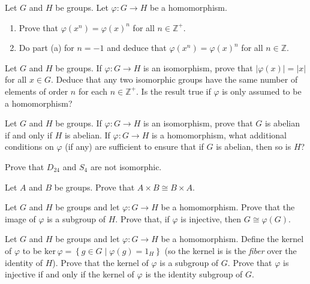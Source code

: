 \documentclass[
    11pt,a4paper,
]{exam}
\begin{document}
\begin{questions}
    
    
    \question
    
    Let \(G\) and \(H\) be groups.  Let \(\varphi: {G} \rightarrow {H}\) be a homomorphism.
    \begin{enumerate}[label=(\alph*)]
        \item Prove that \(\varphi\left(x^n\right)=\varphi(x)^n\) for all \(n \in \mathbb{Z}^{+}\).
        \item  Do part (a) for \(n=-1\) and deduce that \(\varphi\left(x^n\right)=\varphi(x)^n\) for all \(n \in \mathbb{Z}\).
    \end{enumerate}
    
    
    
    
    
    \question
    
    Let \(G\) and \(H\) be groups. If \(\varphi: G \rightarrow H\) is an isomorphism, prove that \(|\varphi(x)|=|x|\) for all \(x \in G\). Deduce that any two isomorphic groups have the same number of elements of order \(n\) for each \(n \in \mathbb{Z}^{+}\). Is the result true if \(\varphi\) is only assumed to be a homomorphism?
    
    \question
    Let \(G\) and \(H\) be groups. If \(\varphi: G \rightarrow H\) is an isomorphism, prove that \(G\) is abelian if and only if \(H\) is abelian. If \(\varphi: G \rightarrow H\) is a homomorphism, what additional conditions on \(\varphi\) (if any) are sufficient to ensure that if \(G\) is abelian, then so is \(H\)?
    
    \question
    Prove that \(D_{24}\) and \(S_4\) are not isomorphic.
    
    
    
    \question
    Let \(A\) and \(B\) be groups. Prove that \(A \times B \cong B \times A\).
    
    
    \question
    Let \(G\) and \(H\) be groups and let \(\varphi: G \rightarrow H\) be a homomorphism. 
    Prove that the image of \(\varphi\)  is a subgroup of \(H\).
    Prove that, if \(\varphi\) is injective, then \(G \cong \varphi(G)\).
    
    
    \question
    Let \(G\) and \(H\) be groups and let \(\varphi: G \rightarrow H\) be a homomorphism. Define the kernel of \(\varphi\) to be \(\mathrm{ker}\, \varphi = \left\{g \in G \mid \varphi(g)=1_H\right\}\) (so the kernel is   is the \textit{fiber} over the identity of \(H\)). Prove that the kernel of \(\varphi\) is a subgroup   of \(G\). Prove that \(\varphi\) is injective if and only if the kernel of \(\varphi\) is the identity subgroup of \(G\).
    

\end{questions}
\end{document}
